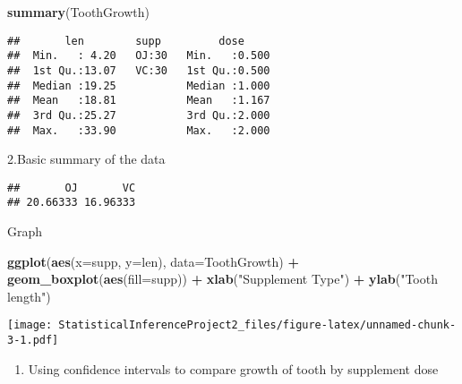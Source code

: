 \documentclass[
]{article}
\newenvironment{Shaded}{\begin{snugshade}}{\end{snugshade}}
\newcommand{\AttributeTok}[1]{\textcolor[rgb]{0.13,0.29,0.53}{#1}}
\newcommand{\FunctionTok}[1]{\textcolor[rgb]{0.13,0.29,0.53}{\textbf{#1}}}
\newcommand{\NormalTok}[1]{#1}
\newcommand{\OtherTok}[1]{\textcolor[rgb]{0.56,0.35,0.01}{#1}}
\newcommand{\SpecialCharTok}[1]{\textcolor[rgb]{0.81,0.36,0.00}{\textbf{#1}}}
\newcommand{\StringTok}[1]{\textcolor[rgb]{0.31,0.60,0.02}{#1}}
\providecommand{\tightlist}{%
  \setlength{\itemsep}{0pt}\setlength{\parskip}{0pt}}
\begin{document}
\begin{Shaded}
\begin{Highlighting}[]
\FunctionTok{summary}\NormalTok{(ToothGrowth)}
\end{Highlighting}
\end{Shaded}

\begin{verbatim}
##       len        supp         dose      
##  Min.   : 4.20   OJ:30   Min.   :0.500  
##  1st Qu.:13.07   VC:30   1st Qu.:0.500  
##  Median :19.25           Median :1.000  
##  Mean   :18.81           Mean   :1.167  
##  3rd Qu.:25.27           3rd Qu.:2.000  
##  Max.   :33.90           Max.   :2.000
\end{verbatim}

2.Basic summary of the data

\begin{Shaded}
\end{Shaded}

\begin{verbatim}
##       OJ       VC 
## 20.66333 16.96333
\end{verbatim}

Graph

\begin{Shaded}
\begin{Highlighting}[]
\FunctionTok{ggplot}\NormalTok{(}\FunctionTok{aes}\NormalTok{(}\AttributeTok{x=}\NormalTok{supp, }\AttributeTok{y=}\NormalTok{len), }\AttributeTok{data=}\NormalTok{ToothGrowth) }\SpecialCharTok{+} \FunctionTok{geom\_boxplot}\NormalTok{(}\FunctionTok{aes}\NormalTok{(}\AttributeTok{fill=}\NormalTok{supp)) }\SpecialCharTok{+} 
    \FunctionTok{xlab}\NormalTok{(}\StringTok{"Supplement Type"}\NormalTok{) }\SpecialCharTok{+}
    \FunctionTok{ylab}\NormalTok{(}\StringTok{"Tooth length"}\NormalTok{) }
\end{Highlighting}
\end{Shaded}

\texttt{[image: StatisticalInferenceProject2\_files/figure-latex/unnamed-chunk-3-1.pdf]}

\begin{enumerate}
\def\labelenumi{\arabic{enumi}.}
\setcounter{enumi}{2}
\tightlist
\item
  Using confidence intervals to compare growth of tooth by supplement
  dose
\end{enumerate}
\end{document}
